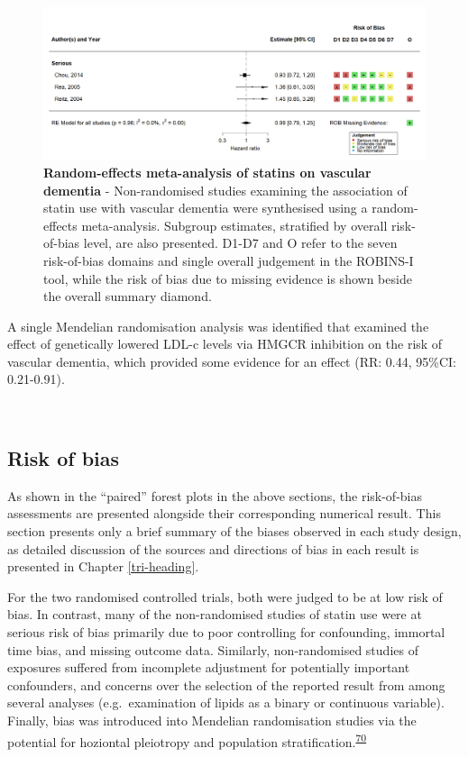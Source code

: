 \documentclass[a4paper, twoside]{templates/ociamthesis}
\begin{document}
\begin{figure}[H]
\includegraphics[width=1\linewidth]{figures/sys-rev/fp_obs_Statin-Ever_VaD} \caption[Random-effects meta-analysis of statins on vascular dementia]{\textbf{Random-effects meta-analysis of statins on vascular dementia} - Non-randomised studies examining the association of statin use with vascular dementia were synthesised using a random-effects meta-analysis. Subgroup estimates, stratified by overall risk-of-bias level, are also presented. D1-D7 and O refer to the seven risk-of-bias domains and single overall judgement in the ROBINS-I tool, while the risk of bias due to missing evidence is shown beside the overall summary diamond.}\label{fig:obsStatinVaDFig}
\end{figure}

A single Mendelian randomisation analysis was identified that examined the effect of genetically lowered LDL-c levels via HMGCR inhibition on the risk of vascular dementia, which provided some evidence for an effect (RR: 0.44, 95\%CI: 0.21-0.91).

~

\hypertarget{risk-of-bias-res}{%
\subsection{Risk of bias}\label{risk-of-bias-res}}

As shown in the ``paired'' forest plots in the above sections, the risk-of-bias assessments are presented alongside their corresponding numerical result. This section presents only a brief summary of the biases observed in each study design, as detailed discussion of the sources and directions of bias in each result is presented in Chapter \ref{tri-heading}.

For the two randomised controlled trials, both were judged to be at low risk of bias. In contrast, many of the non-randomised studies of statin use were at serious risk of bias primarily due to poor controlling for confounding, immortal time bias, and missing outcome data. Similarly, non-randomised studies of exposures suffered from incomplete adjustment for potentially important confounders, and concerns over the selection of the reported result from among several analyses (e.g.~examination of lipids as a binary or continuous variable). Finally, bias was introduced into Mendelian randomisation studies via the potential for hoziontal pleiotropy and population stratification.\textsuperscript{\protect\hyperlink{ref-davies2018}{70}}
\end{document}

